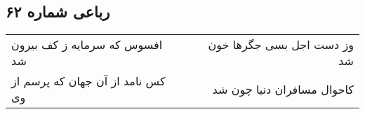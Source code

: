 \begin{center}
\section*{رباعی شماره ۶۲}
\label{sec:sh062}
\begin{longtable}{l p{0.5cm} r}
افسوس که سرمایه ز کف بیرون شد
&&
وز دست اجل بسی جگرها خون شد
\\
کس نامد از آن جهان که پرسم از وی
&&
کاحوال مسافران دنیا چون شد
\\
\end{longtable}
\end{center}
